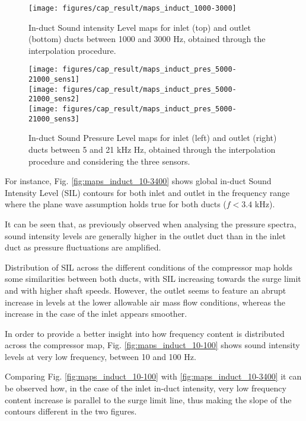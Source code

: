 \begin{figure}[tbh!]
\centering
\texttt{[image: figures/cap\_result/maps\_induct\_1000-3000]}
\vspace{-2.25cm}
\caption{In-duct Sound intensity Level maps for inlet (top) and outlet (bottom) ducts between 1000 and 3000 Hz, obtained through the interpolation procedure.}
\label{fig:maps_induct_1000-3000}
\end{figure}

\begin{figure}[tbh!]
\centering
\texttt{[image: figures/cap\_result/maps\_induct\_pres\_5000-21000\_sens1]}\\[4mm]
\texttt{[image: figures/cap\_result/maps\_induct\_pres\_5000-21000\_sens2]}\\[4mm]
\texttt{[image: figures/cap\_result/maps\_induct\_pres\_5000-21000\_sens3]}
\caption{In-duct Sound Pressure Level maps for inlet (left) and outlet (right) ducts between 5 and 21 kHz Hz, obtained through the interpolation procedure and considering the three sensors.}
\label{fig:maps_induct_SPL_3sens}
\end{figure}

For instance, Fig. \ref{fig:maps_induct_10-3400} shows global in-duct Sound Intensity Level (SIL) contours for both inlet and outlet in the frequency range where the plane wave assumption holds true for both ducts ($f<3.4$ kHz). 

It can be seen that, as previously observed when analysing the pressure spectra, sound intensity levels are generally higher in the outlet duct than in the inlet duct as pressure fluctuations are amplified. 

Distribution of SIL across the different conditions of the compressor map holds some similarities between both ducts, with SIL increasing towards the surge limit and with higher shaft speeds. However, the outlet seems to feature an abrupt increase in levels at the lower allowable air mass flow conditions, whereas the increase in the case of the inlet appears smoother. 

In order to provide a better insight into how frequency content is distributed across the compressor map, Fig. \ref{fig:maps_induct_10-100} shows sound intensity levels at very low frequency, between 10 and 100 Hz.

Comparing Fig. \ref{fig:maps_induct_10-100} with \ref{fig:maps_induct_10-3400} it can be observed how, in the case of the inlet in-duct intensity, very low frequency content increase is parallel to the surge limit line, thus making the slope of the contours different in the two figures.

